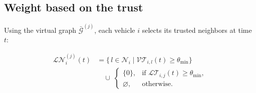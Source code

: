 \documentclass{ifacconf}
\def\V{\mathcal{V}} %
\def\G{\mathcal{G}} %
\def\N{\mathcal{N}} %
\def\LT{\mathcal{LT}} %
\def\VT{\mathcal{VT}} %
\begin{document}
\subsection{Weight based on the trust}
Using the virtual graph $\bar{\G}^{(j)}$, each vehicle $i$ selects its trusted neighbors at time $t$:



\begin{align}
\mathcal{LN}^{(j)}_{i}(t)
&= \Big\{\, l \in \N_i \;\big|\; \VT_{i,l}(t) \ge \theta_{\min} \Big\} \nonumber \\
&\quad \cup\;
\begin{cases}
\{0\}, & \text{if } \LT_{i,j}(t) \ge \theta_{\min},\\
\varnothing, & \text{otherwise}.
\end{cases}
\end{align}

\end{document}
